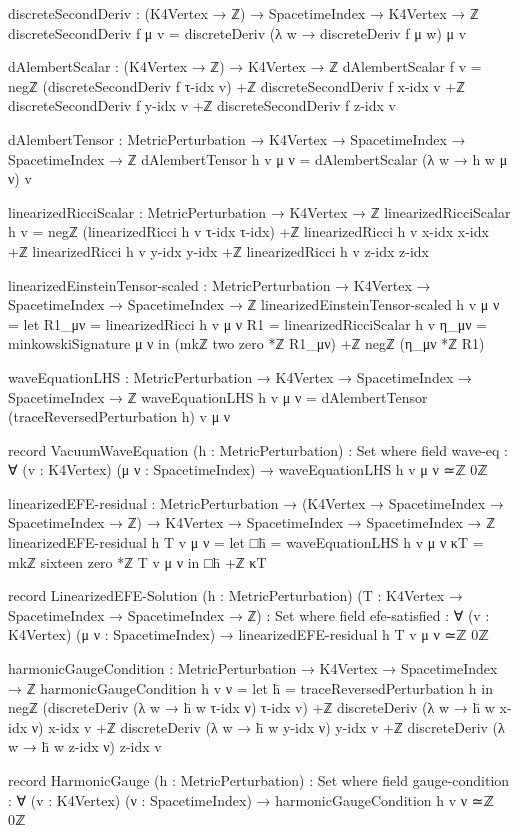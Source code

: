 \documentclass[11pt,a4paper]{book}
\begin{document}
\begin{code}
discreteSecondDeriv : (K4Vertex → ℤ) → SpacetimeIndex → K4Vertex → ℤ
discreteSecondDeriv f μ v = 
  discreteDeriv (λ w → discreteDeriv f μ w) μ v

dAlembertScalar : (K4Vertex → ℤ) → K4Vertex → ℤ
dAlembertScalar f v = 
  negℤ (discreteSecondDeriv f τ-idx v) +ℤ
  discreteSecondDeriv f x-idx v +ℤ
  discreteSecondDeriv f y-idx v +ℤ
  discreteSecondDeriv f z-idx v

dAlembertTensor : MetricPerturbation → K4Vertex → 
                  SpacetimeIndex → SpacetimeIndex → ℤ
dAlembertTensor h v μ ν = dAlembertScalar (λ w → h w μ ν) v

linearizedRicciScalar : MetricPerturbation → K4Vertex → ℤ
linearizedRicciScalar h v = 
  negℤ (linearizedRicci h v τ-idx τ-idx) +ℤ
  linearizedRicci h v x-idx x-idx +ℤ
  linearizedRicci h v y-idx y-idx +ℤ
  linearizedRicci h v z-idx z-idx

linearizedEinsteinTensor-scaled : MetricPerturbation → K4Vertex → 
                                   SpacetimeIndex → SpacetimeIndex → ℤ
linearizedEinsteinTensor-scaled h v μ ν = 
  let R1_μν = linearizedRicci h v μ ν
      R1    = linearizedRicciScalar h v
      η_μν  = minkowskiSignature μ ν
  in (mkℤ two zero *ℤ R1_μν) +ℤ negℤ (η_μν *ℤ R1)

waveEquationLHS : MetricPerturbation → K4Vertex → 
                  SpacetimeIndex → SpacetimeIndex → ℤ
waveEquationLHS h v μ ν = dAlembertTensor (traceReversedPerturbation h) v μ ν

record VacuumWaveEquation (h : MetricPerturbation) : Set where
  field
    wave-eq : ∀ (v : K4Vertex) (μ ν : SpacetimeIndex) →
              waveEquationLHS h v μ ν ≃ℤ 0ℤ

linearizedEFE-residual : MetricPerturbation → 
                          (K4Vertex → SpacetimeIndex → SpacetimeIndex → ℤ) →
                          K4Vertex → SpacetimeIndex → SpacetimeIndex → ℤ
linearizedEFE-residual h T v μ ν = 
  let □h̄ = waveEquationLHS h v μ ν
      κT  = mkℤ sixteen zero *ℤ T v μ ν
  in □h̄ +ℤ κT

record LinearizedEFE-Solution (h : MetricPerturbation) 
                               (T : K4Vertex → SpacetimeIndex → SpacetimeIndex → ℤ) : Set where
  field
    efe-satisfied : ∀ (v : K4Vertex) (μ ν : SpacetimeIndex) →
                    linearizedEFE-residual h T v μ ν ≃ℤ 0ℤ

harmonicGaugeCondition : MetricPerturbation → K4Vertex → SpacetimeIndex → ℤ
harmonicGaugeCondition h v ν = 
  let h̄ = traceReversedPerturbation h
  in negℤ (discreteDeriv (λ w → h̄ w τ-idx ν) τ-idx v) +ℤ
     discreteDeriv (λ w → h̄ w x-idx ν) x-idx v +ℤ
     discreteDeriv (λ w → h̄ w y-idx ν) y-idx v +ℤ
     discreteDeriv (λ w → h̄ w z-idx ν) z-idx v

record HarmonicGauge (h : MetricPerturbation) : Set where
  field
    gauge-condition : ∀ (v : K4Vertex) (ν : SpacetimeIndex) →
                      harmonicGaugeCondition h v ν ≃ℤ 0ℤ
\end{code}
\end{document}
